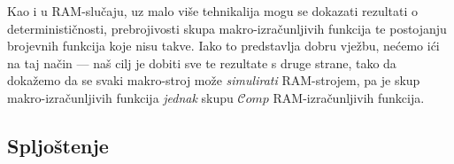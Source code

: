 Kao i u RAM-slučaju, uz malo više tehnikalija mogu se dokazati rezultati o determinističnosti, prebrojivosti skupa makro-izračunljivih funkcija te postojanju brojevnih funkcija koje nisu takve. Iako to predstavlja dobru vježbu, nećemo ići na taj način --- naš cilj je dobiti sve te rezultate s druge strane, tako da dokažemo da se svaki makro-stroj može \emph{simulirati} RAM-strojem, pa je skup makro-izračunljivih funkcija \emph{jednak} skupu $\mathscr Comp$ RAM-izračunljivih funkcija.





\subsection{Spljoštenje}


